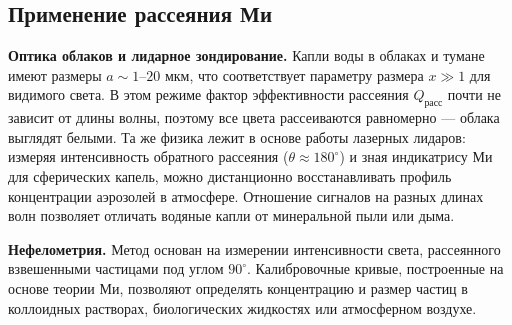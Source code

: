 \documentclass[12pt, a4paper]{article}
\begin{document}




\subsection*{Применение рассеяния Ми}
\textbf{Оптика облаков и лидарное зондирование.} Капли воды в облаках и тумане имеют размеры $a \sim 1\text{--}20$ мкм, что соответствует параметру размера $x \gg 1$ для видимого света. В этом режиме фактор эффективности рассеяния $Q_{\text{расс}}$ почти не зависит от длины волны, поэтому все цвета рассеиваются равномерно — облака выглядят белыми. Та же физика лежит в основе работы лазерных лидаров: измеряя интенсивность обратного рассеяния ($\theta \approx 180^\circ$) и зная индикатрису Ми для сферических капель, можно дистанционно восстанавливать профиль концентрации аэрозолей в атмосфере. Отношение сигналов на разных длинах волн позволяет отличать водяные капли от минеральной пыли или дыма.

\textbf{Нефелометрия.} Метод основан на измерении интенсивности света, рассеянного взвешенными частицами под углом $90^\circ$. Калибровочные кривые, построенные на основе теории Ми, позволяют определять концентрацию и размер частиц в коллоидных растворах, биологических жидкостях или атмосферном воздухе.





\end{document}
